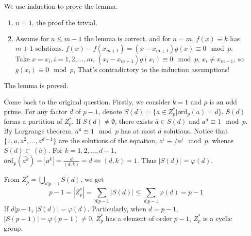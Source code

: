 \begin{answer}
    We use induction to prove the lemma.

    \begin{enumerate}
        \item $n=1$, the proof the trivial.
        \item Assume for $n\leq m-1$ the lemma is correct, and for $n= m$, $f(x)\equiv k$ has $m+1$ solutions. $f(x)-f(x_{m+1})=(x-x_{m+1})g(x)\equiv 0\mod p$. Take $x=x_{i}, i=1,2,\dots ,m$, $(x_{i}-x_{m+1})g(x_{i})\equiv 0\mod p$, $x_{i}\neq x_{m+1}$, so $g(x_{i})\equiv 0\mod p$, That's contradictory to the induction assumptions! 
    \end{enumerate}
    The lemma is proved.

    Come back to the original question. Firstly, we consider $k=1$ and $p$ is an odd prime. For any factor $d$ of $p-1$, denote $S(d)=\{\bar{a}\in Z_{p}^{*}|\mathrm{ord}_p(a)=d\}$. $S(d)$ forms a partition of $Z_{p}^{*}$. If $S(d)\neq \emptyset$, there exists $\bar{a}\in S(d)$ and $a^{d}\equiv 1\mod p$. By Largrange theorem, $a^{d}\equiv 1\mod p$ has at most $d$ solutions. Notice that $\{1,a,a^{2},\dots, a^{d-1}\}$ are the solutions of the equation, $a^{i}\equiv \!\!\!\!\!\!/a^{j}\mod p$, whence $S(d)\subset\left\langle\bar{a}\right\rangle$. For $k=1,2,\dots,d-1$, $\mathrm{ord}_p(\bar{a^{k}})=\left| a^{k} \right| =\frac{d}{(d,k)}=d\Leftrightarrow(d,k)=1$. Thus $\left| S(d) \right| =\varphi(d)$.

    From $Z_{p}^{*}=\bigcup\limits_{d|p-1}S(d)$, we get \[p-1=\left| Z_{p}^{*} \right| =\sum\limits_{d|p-1}\left| S(d) \right| \leq \sum_{d|p-1}\varphi(d)=p-1\] If $d|p-1$, $\left| S(d) \right| =\varphi(d)$. Particularly, when $d=p-1$, $\left| S(p-1) \right| =\varphi(p-1)\neq 0$, $Z_{p}^{*}$ has a element of order $p-1$, $Z_{p}^{*}$ is a cyclic group.


\end{answer}
